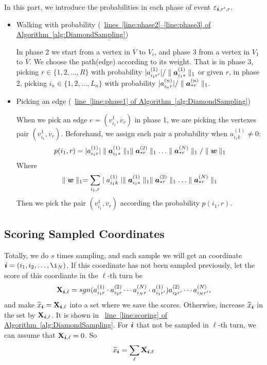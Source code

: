 \documentclass[letterpaper]{article}
\newcommand{\Sca}[3]{{#1}^{(#2)}_{i_#2#3}}%
\newcommand{\V}[1]{{\bm{{\MakeLowercase{#1}}}}}
\newcommand{\Varow}[1]{\V{a}^{(#1)}_{i_#1*}}
\newcommand{\Vacol}[1]{\V{a}^{(#1)}_{*r}}
\newcommand{\M}[1]{{\bm{\mathbf{\MakeUppercase{#1}}}}}
\newcommand{\norm}[2]{\parallel#1\parallel_{#2}}
\newcommand{\AlgLine}[2]{\hyperref[alg:#1]{line~\ref*{line:#2} of Algorithm~\ref*{alg:#1}}}
\newcommand{\AlgLines}[3]{\hyperref[alg:#1]{lines~\ref*{line:#2}--\ref*{line:#3} of Algorithm~\ref*{alg:#1}}}
\begin{document}
In this part, we introduce the probabilities in each phase of event $\varepsilon_{\V{i},r',r}$.

\begin{itemize}
  \item Walking with probability  (~\AlgLines{DiamondSampling}{phase2}{phase3})

  In phase 2 we start from a vertex in $\overline{V}$ to $V_i$, and phase 3 from a vertex in $V_1$ to $\overline{V}$. We choose the path(edge) according to its weight. That is in phase 3, picking $r\in\{1,2,\ldots,R\}$ with probability $|\Sca{a}{1}{r'}|/\norm{\Varow{1}}{1}$ or given $r$, in phase 2, picking $i_n\in\{1,2,\ldots,L_n\}$ with probability $|\Sca{a}{n}{r}|/\norm{\Vacol{n}}{1}$.

  \item Picking an edge (~\AlgLine{DiamondSampling}{phase1})

  When we pick an edge $e=(v^1_{i_1},\overline{v}_r)$ in phase 1, we are picking the vertexes pair $(v^1_{i_1},\overline{v}_r)$. Beforehand, we assign each pair a probability when $ \Sca{a}{1}{k} \neq 0 $:
  \[
    p(i_1,r) = |\Sca{a}{1}{r}|\norm{\Varow{1}}{1} \norm{\Vacol{2}}{1} \ldots \norm{\Vacol{N}}{1} / \norm{\V{W}}{1}
  \]
  Where
  \[
    \norm{\V{W}}{1} = \sum_{i_1,r}\mid \Sca{a}{1}{k}\mid \norm{\Varow{1}}{1} \norm{\Vacol{2}}{1} \ldots \norm{\Vacol{N}}{1}
  \]
  Then we pick the pair $(v^1_{i_1},\overline{v}_r)$ according the probability $p(i_1,r)$.
\end{itemize}

\subsection{Scoring Sampled Coordinates}

Totally, we do $s$ times sampling, and each sample we will get an coordinate $\V{i} = (i_1,i_2,\ldots,\i_N) $. If this coordinate has not been sampled previously, let the score of this coordiante in the $\ell $-th turn be
\[
\M{X}_{\V{i},\ell}  = sgn(\Sca{a}{1}{r}\cdot\Sca{a}{2}{r}\cdots\Sca{a}{N}{r}\cdot\Sca{a}{1}{r'}) \Sca{a}{2}{r'}\cdots\Sca{a}{N}{r'},
\]
and make $\widehat{x}_{\V{i}} = \M{X}_{\V{i},\ell}$ into a set where we save the scores. Otherwise, increase $\widehat{x}_{\V{i}}$ in the set by $\M{X}_{\V{i},\ell}$. It is shown in ~\AlgLine{DiamondSampling}{scoring}. For $\V{i}$ that not be sampled in $\ell$-th turn, we can assume that $\M{X}_{\V{i},\ell}=0$. So
\[
\widehat{x}_{\V{i}} = \sum_{\ell} \M{X}_{\V{i},\ell}
\]
\end{document}
